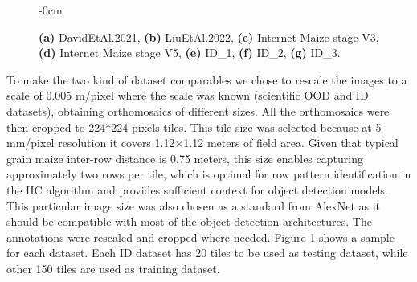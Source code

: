 \documentclass[12pt,a4paper,oneside]{report}
\newlength{\extralength}
\begin{document}
\begin{figure}[H]
\begin{adjustwidth}{-\extralength}{0cm}
  \caption{\textbf{(a)} DavidEtAl.2021,
  \textbf{(b)} LiuEtAl.2022, 
  \textbf{(c)} Internet Maize stage V3,
  \textbf{(d)} Internet Maize stage V5,
  \textbf{(e)} ID\_1,
  \textbf{(f)} ID\_2,
  \textbf{(g)} ID\_3.}
  \label{fig:datasets}  
\end{adjustwidth}
\end{figure}


To make the two kind of dataset comparables we chose to rescale the images to a scale of 0.005 m/pixel
where the scale was known (scientific OOD and ID datasets), obtaining orthomosaics of different sizes.
All the orthomosaics were then cropped to 224*224 pixels tiles.
This tile size was selected because at 5 mm/pixel resolution it covers 1.12×1.12 meters of field area.
Given that typical grain maize inter-row distance is 0.75 meters, this size enables capturing 
approximately two rows per tile, which is optimal for row pattern identification in the HC algorithm 
and provides sufficient context for object detection models.
This particular image size was also chosen as a standard from AlexNet \cite{krizhevskyImageNetClassificationDeep2012}
as it should be compatible with most of the object detection architectures.
The annotations were rescaled and cropped where needed.
Figure \ref{fig:datasets} shows a sample for each dataset.
Each ID dataset has 20 tiles to be used as testing dataset, while other 
150 tiles are used as training dataset.
\end{document}
